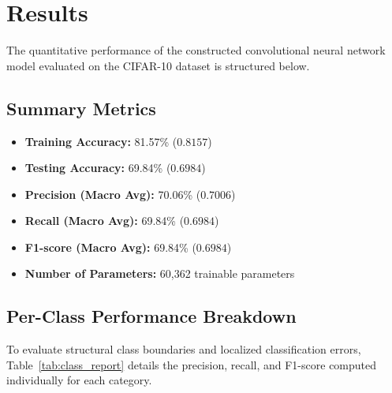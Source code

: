 \documentclass[11pt]{article}
\begin{document}
\section{Results}
The quantitative performance of the constructed convolutional neural network model evaluated on the CIFAR-10 dataset is structured below.

\subsection{Summary Metrics}
\begin{itemize}
    \item \textbf{Training Accuracy:} 81.57\% ($0.8157$)
    \item \textbf{Testing Accuracy:} 69.84\% ($0.6984$)
    \item \textbf{Precision (Macro Avg):} 70.06\% ($0.7006$)
    \item \textbf{Recall (Macro Avg):} 69.84\% ($0.6984$)
    \item \textbf{F1-score (Macro Avg):} 69.84\% ($0.6984$)
    \item \textbf{Number of Parameters:} 60,362 trainable parameters
\end{itemize}

\subsection{Per-Class Performance Breakdown}
To evaluate structural class boundaries and localized classification errors, Table~\ref{tab:class_report} details the precision, recall, and F1-score computed individually for each category.
\end{document}
